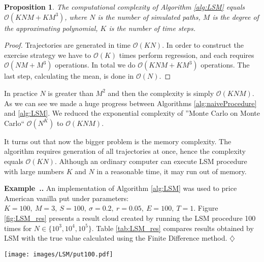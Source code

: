 \documentclass[a4paper,11pt, twoside]{book}
\newtheorem{prop}[thm]{Proposition}
\theoremstyle{definition}
\theoremstyle{remark}
\newcounter{example}[chapter]
\newenvironment{example}
   {\refstepcounter{example} \par\medskip\noindent \textbf{Example~\arabic{chapter}.\arabic{example}.}  }
   {\hfill $\diamondsuit$\par\noindent\ignorespacesafterend}
\begin{document}

\begin{prop}
 The computational complexity of Algorithm \ref{alg:LSM} equals $\mathcal{O}(KNM + KM^3)$, where $N$ is the number of simulated paths, $M$ is the degree of the approximating polynomial, $K$ is the number of time steps.
\end{prop}
\begin{proof}
 Trajectories are generated in time $\mathcal{O}(KN)$. In order to construct the exercise strategy we have to $\mathcal{O}(K)$ times perform regression, and each requires $\mathcal{O}(NM + M^3)$ operations. In total we do $\mathcal{O}(KNM + KM^3)$ operations. The last step, calculating the mean, is done in $\mathcal{O}(N)$.
\end{proof}

In practice $N$ is greater than $M^2$ and then the complexity is simply $\mathcal{O}(KNM)$. As we can see we made a huge progress between Algorithms \ref{alg:naiveProcedure} and \ref{alg:LSM}. We reduced the exponential complexity of ''Monte Carlo on Monte Carlo`` $\mathcal{O}(N^K)$ to $\mathcal{O}(KNM)$.

It turns out that now the bigger problem is the memory complexity. The algorithm requires generation of all trajectories at once, hence the complexity equals $\mathcal{O}(KN)$. Although an ordinary computer can execute LSM procedure with large numbers $K$ and $N$ in a reasonable time, it may run out of memory.
\FloatBarrier
\begin{example}
 An implementation of Algorithm \ref{alg:LSM} was used to price American vanilla put under parameters: $K=100,\ M=3,\ S=100,\ \sigma=0.2,\ r=0.05,\ E=100,\ T=1$. Figure \ref{fig:LSM_res} presents a result cloud created by running the LSM procedure 100 times for $N \in \{10^3, 10^4, 10^5\}$. Table \ref{tab:LSM_res} compares results obtained by LSM with the true value calculated using the Finite Difference method. 
\end{example}

\begin{SCfigure}[][h]
\centering
 \texttt{[image: images/LSM/put100.pdf]}
\caption{The dispersion of the results obtained by executing the LSM procedure for different numbers of simulations. For each $N$, the procedure was run 100 times. Hence, for each $N$ we obtained 100 estimations of the price. Small points indicate obtained values. }
\label{fig:LSM_res}
\end{SCfigure}
\end{document}
